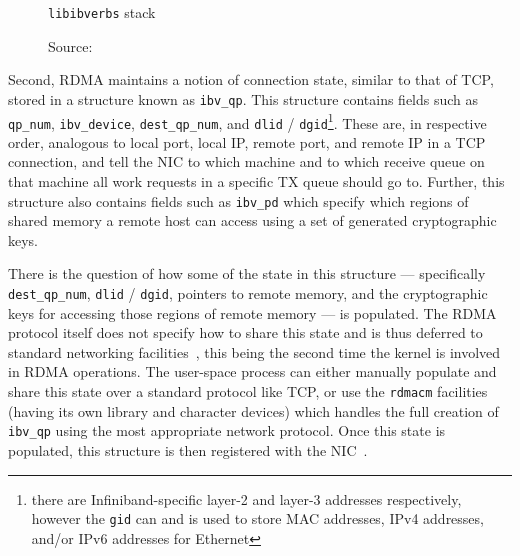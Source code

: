 \documentclass[12pt,titlepage]{article}
\begin{document}
\begin{figure}
	\centering
	\caption{\texttt{libibverbs} stack}
	\caption*{Source:~\cite{mlnxofedmanual}}
\end{figure}

Second, RDMA maintains a notion of connection state, similar to that of TCP, stored in a structure known as \texttt{ibv\_qp}\@.
This structure contains fields such as \texttt{qp\_num}, \texttt{ibv\_device}, \texttt{dest\_qp\_num}, and \texttt{dlid} / \texttt{dgid}\footnote{there are Infiniband-specific layer-2 and layer-3 addresses respectively, however the \texttt{gid} can and is used to store MAC addresses, IPv4 addresses, and/or IPv6 addresses for Ethernet}.
These are, in respective order, analogous to local port, local IP, remote port, and remote IP in a TCP connection, and tell the NIC to which machine and to which receive queue on that machine all work requests in a specific TX queue should go to.
Further, this structure also contains fields such as \texttt{ibv\_pd} which specify which regions of shared memory a remote host can access using a set of generated cryptographic keys.

There is the question of how some of the state in this structure --- specifically \texttt{dest\_qp\_num}, \texttt{dlid} / \texttt{dgid}, pointers to remote memory, and the cryptographic keys for accessing those regions of remote memory --- is populated.
The RDMA protocol itself does not specify how to share this state and is thus deferred to standard networking facilities~\cite{rocev2spec}, this being the second time the kernel is involved in RDMA operations.
The user-space process can either manually populate and share this state over a standard protocol like TCP, or use the \texttt{rdmacm} facilities (having its own library and character devices) which handles the full creation of \texttt{ibv\_qp} using the most appropriate network protocol.
Once this state is populated, this structure is then registered with the NIC~\cite{rdmacoredocumentation,rdmacorerepo,rdmaawareprogramming}.
\end{document}
